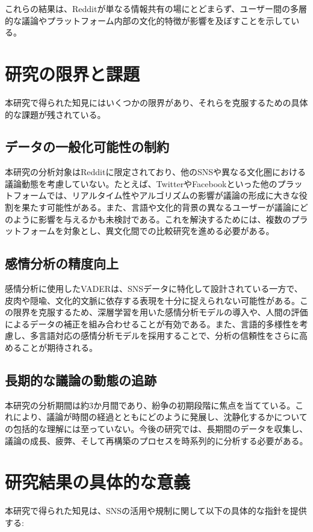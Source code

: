 \documentclass[11pt, a4j]{jreport}
\begin{document}
    これらの結果は、Redditが単なる情報共有の場にとどまらず、ユーザー間の多層的な議論やプラットフォーム内部の文化的特徴が影響を及ぼすことを示している。

    \section{研究の限界と課題}
    本研究で得られた知見にはいくつかの限界があり、それらを克服するための具体的な課題が残されている。

    \subsection{データの一般化可能性の制約}
    本研究の分析対象はRedditに限定されており、他のSNSや異なる文化圏における議論動態を考慮していない。たとえば、TwitterやFacebookといった他のプラットフォームでは、リアルタイム性やアルゴリズムの影響が議論の形成に大きな役割を果たす可能性がある。また、言語や文化的背景の異なるユーザーが議論にどのように影響を与えるかも未検討である。これを解決するためには、複数のプラットフォームを対象とし、異文化間での比較研究を進める必要がある。

    \subsection{感情分析の精度向上}
    感情分析に使用したVADERは、SNSデータに特化して設計されている一方で、皮肉や隠喩、文化的文脈に依存する表現を十分に捉えられない可能性がある。この限界を克服するため、深層学習を用いた感情分析モデルの導入や、人間の評価によるデータの補正を組み合わせることが有効である。また、言語的多様性を考慮し、多言語対応の感情分析モデルを採用することで、分析の信頼性をさらに高めることが期待される。

    \subsection{長期的な議論の動態の追跡}
    本研究の分析期間は約3か月間であり、紛争の初期段階に焦点を当てている。これにより、議論が時間の経過とともにどのように発展し、沈静化するかについての包括的な理解には至っていない。今後の研究では、長期間のデータを収集し、議論の成長、疲弊、そして再構築のプロセスを時系列的に分析する必要がある。

    \section{研究結果の具体的な意義}
    本研究で得られた知見は、SNSの活用や規制に関して以下の具体的な指針を提供する:
\end{document}
